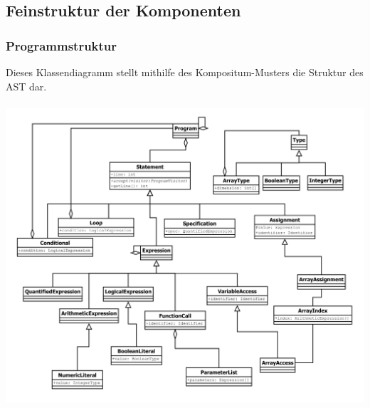 \documentclass[10pt,a4paper,titlepage]{article}
\begin{document}
\subsection{Feinstruktur der Komponenten}
\subsubsection{Programmstruktur}
Dieses Klassendiagramm stellt mithilfe des Kompositum-Musters die Struktur des AST dar. \\\\
\includegraphics[scale=0.85]{images/AST.pdf}
\end{document}
